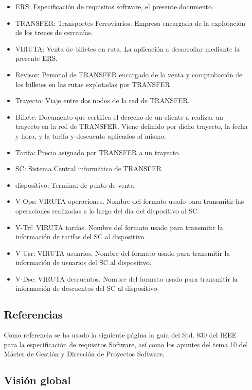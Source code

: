 \begin{itemize}
\item ERS: Especificación de requisitos software, el presente documento.
\item TRANSFER: Transportes Ferroviarios. Empresa encargada de la explotación de los trenes de cercanías.
\item VIRUTA: Venta de billetes en ruta. La aplicación a desarrollar mediante la presente ERS.
\item Revisor: Personal de TRANSFER encargado de la venta y comprobación de los billetes en las rutas explotadas por TRANSFER.
\item Trayecto: Viaje entre dos nodos de la red de TRANSFER.
\item Billete: Documento que certifica el derecho de un cliente a realizar un trayecto en la red de TRANSFER. Viene definido por dicho trayecto, la fecha y hora, y la tarifa y descuento aplicados al mismo.
\item Tarifa: Precio asignado por TRANSFER a un trayecto.
\item SC: Sistema Central informático de TRANSFER
\item dispositivo: Terminal de punto de venta.
\item V-Ops: VIRUTA operaciones. Nombre del formato usado para transmitir las operaciones realizadas a lo largo del día del dispositivo al SC.
\item V-Trf: VIRUTA tarifas. Nombre del formato usado para transmitir la información de tarifas del SC al dispositivo.
\item V-Usr: VIRUTA usuarios. Nombre del formato usado para transmitir la información de usuarios del SC al dispositivo.
\item V-Dsc: VIRUTA descuentos. Nombre del formato usado para transmitir la información de descuentos del SC al dispositivo.

\end{itemize}

\subsection{Referencias}
Como referencia se ha usado la siguiente página la guía del Std. 830 del IEEE para la especificación de requisitos Software, así como los apuntes del tema 10 del Máster de Gestión y Dirección de Proyectos Software.


\subsection{Visión global} 

